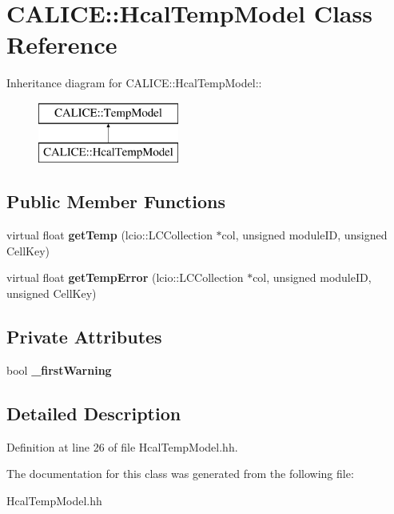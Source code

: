 \section{CALICE::HcalTempModel Class Reference}
\label{classCALICE_1_1HcalTempModel}
Inheritance diagram for CALICE::HcalTempModel::\begin{figure}[H]
\begin{center}
\leavevmode
\includegraphics[height=2cm]{classCALICE_1_1HcalTempModel}
\end{center}
\end{figure}
\subsection*{Public Member Functions}
\begin{DoxyCompactItemize}
\item 
virtual float {\bfseries getTemp} (lcio::LCCollection $\ast$col, unsigned moduleID, unsigned CellKey)\label{classCALICE_1_1HcalTempModel_a76afabe82f217f618a8f20098c9cb91b}

\item 
virtual float {\bfseries getTempError} (lcio::LCCollection $\ast$col, unsigned moduleID, unsigned CellKey)\label{classCALICE_1_1HcalTempModel_a4f7355963e4df4c83efb5135a241f785}

\end{DoxyCompactItemize}
\subsection*{Private Attributes}
\begin{DoxyCompactItemize}
\item 
bool {\bfseries \_\-firstWarning}\label{classCALICE_1_1HcalTempModel_a883bb0526e7d1310bedd3f10bfd4e314}

\end{DoxyCompactItemize}


\subsection{Detailed Description}


Definition at line 26 of file HcalTempModel.hh.

The documentation for this class was generated from the following file:\begin{DoxyCompactItemize}
\item 
HcalTempModel.hh\end{DoxyCompactItemize}
